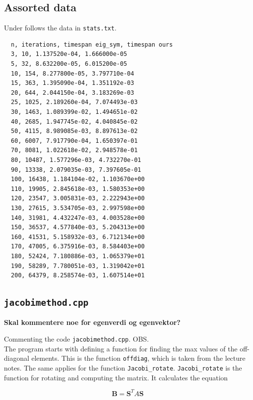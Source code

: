 \documentclass{article}
\begin{document}
\subsection{Assorted data}

Under follows the data in \texttt{stats.txt}.

\begin{verbatim}
  n, iterations, timespan eig_sym, timespan ours
  3, 10, 1.137520e-04, 1.666000e-05
  5, 32, 8.632200e-05, 6.015200e-05
  10, 154, 8.277800e-05, 3.797710e-04
  15, 363, 1.395090e-04, 1.351192e-03
  20, 644, 2.044150e-04, 3.183269e-03
  25, 1025, 2.189260e-04, 7.074493e-03
  30, 1463, 1.089399e-02, 1.494651e-02
  40, 2685, 1.947745e-02, 4.040845e-02
  50, 4115, 8.989085e-03, 8.897613e-02
  60, 6007, 7.917790e-04, 1.650397e-01
  70, 8081, 1.022618e-02, 2.948578e-01
  80, 10487, 1.577296e-03, 4.732270e-01
  90, 13338, 2.079035e-03, 7.397605e-01
  100, 16438, 1.184104e-02, 1.103670e+00
  110, 19905, 2.845618e-03, 1.580353e+00
  120, 23547, 3.005831e-03, 2.222943e+00
  130, 27615, 3.534705e-03, 2.997598e+00
  140, 31981, 4.432247e-03, 4.003528e+00
  150, 36537, 4.577840e-03, 5.204313e+00
  160, 41531, 5.158932e-03, 6.712134e+00
  170, 47005, 6.375916e-03, 8.584403e+00
  180, 52424, 7.180886e-03, 1.065379e+01
  190, 58289, 7.780051e-03, 1.319042e+01
  200, 64379, 8.258574e-03, 1.607514e+01
\end{verbatim}


\subsection{\texttt{jacobimethod.cpp}}

\textbf{Skal kommentere noe for egenverdi og egenvektor?}

Commenting the code \texttt{jacobimethod.cpp}.  OBS. \\

The program starts with defining a function for finding the max values of the off-diagonal elements. This is the function \texttt{offdiag}, which is taken from the lecture notes. The same applies for the function \texttt{Jacobi\_rotate}. \texttt{Jacobi\_rotate} is the function for rotating and computing the matrix. It calculates the equation

\begin{equation*}
    \textbf{B} = \textbf{S}^T A \textbf{S}
\end{equation*}
\end{document}
